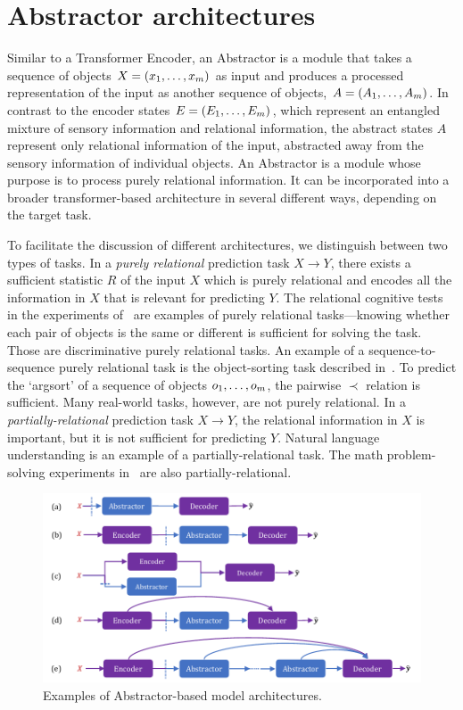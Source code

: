 \section{Abstractor architectures}\label{sec:abstractor_architectures}

Similar to a Transformer Encoder, an Abstractor is a module that takes a sequence of objects $X = (x_1, \ldots, x_m)$ as input and produces a processed representation of the input as another sequence of objects, $A = (A_1, \ldots, A_m)$. In contrast to the encoder states $E = \left(E_1, \ldots, E_m\right)$, which represent an entangled mixture of sensory information and relational information, the abstract states $A$ represent only relational information of the input, abstracted away from the sensory information of individual objects. An Abstractor is a module whose purpose is to process purely relational information. It can be incorporated into a broader transformer-based architecture in several different ways, depending on the target task.

To facilitate the discussion of different architectures, we distinguish between two types of tasks. In a \textit{purely relational} prediction task $X \to Y$, there exists a sufficient statistic $R$ of the input $X$ which is purely relational and encodes all the information in $X$ that is relevant for predicting $Y$. The relational cognitive tests in the experiments of~\citep{esbn,kerg2022neural} are examples of purely relational tasks---knowing whether each pair of objects is the same or different is sufficient for solving the task. Those are discriminative purely relational tasks. An example of a sequence-to-sequence purely relational task is the object-sorting task described in~. To predict the `argsort' of a sequence of objects $o_1, \ldots, o_m$, the pairwise $\prec$ relation is sufficient. Many real-world tasks, however, are not purely relational. In a \textit{partially-relational} prediction task $X \to Y$, the relational information in $X$ is important, but it is not sufficient for predicting $Y$. Natural language understanding is an example of a partially-relational task. The math problem-solving experiments in~ are also partially-relational.

\begin{figure}
    \centering
    \includegraphics[width=\textwidth]{figures/abstractor_architectures.pdf}
    \caption{Examples of Abstractor-based model architectures.}
    \label{fig:abstractor_architectures}
\end{figure}


